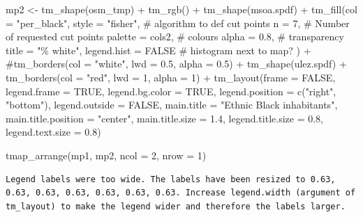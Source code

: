 \documentclass[
  letterpaper,
]{scrbook}
\newenvironment{Shaded}{\begin{snugshade}}{\end{snugshade}}
\newcommand{\AttributeTok}[1]{\textcolor[rgb]{0.40,0.45,0.13}{#1}}
\newcommand{\CommentTok}[1]{\textcolor[rgb]{0.37,0.37,0.37}{#1}}
\newcommand{\ConstantTok}[1]{\textcolor[rgb]{0.56,0.35,0.01}{#1}}
\newcommand{\DecValTok}[1]{\textcolor[rgb]{0.68,0.00,0.00}{#1}}
\newcommand{\FloatTok}[1]{\textcolor[rgb]{0.68,0.00,0.00}{#1}}
\newcommand{\FunctionTok}[1]{\textcolor[rgb]{0.28,0.35,0.67}{#1}}
\newcommand{\NormalTok}[1]{\textcolor[rgb]{0.00,0.23,0.31}{#1}}
\newcommand{\OtherTok}[1]{\textcolor[rgb]{0.00,0.23,0.31}{#1}}
\newcommand{\SpecialCharTok}[1]{\textcolor[rgb]{0.37,0.37,0.37}{#1}}
\newcommand{\StringTok}[1]{\textcolor[rgb]{0.13,0.47,0.30}{#1}}
\begin{document}
\begin{Shaded}
\begin{Highlighting}[]
\NormalTok{mp2 }\OtherTok{\textless{}{-}}  \FunctionTok{tm\_shape}\NormalTok{(osm\_tmp) }\SpecialCharTok{+} \FunctionTok{tm\_rgb}\NormalTok{() }\SpecialCharTok{+}
  \FunctionTok{tm\_shape}\NormalTok{(msoa.spdf) }\SpecialCharTok{+} 
  \FunctionTok{tm\_fill}\NormalTok{(}\AttributeTok{col =} \StringTok{"per\_black"}\NormalTok{, }
          \AttributeTok{style =} \StringTok{"fisher"}\NormalTok{, }\CommentTok{\# algorithm to def cut points}
          \AttributeTok{n =} \DecValTok{7}\NormalTok{, }\CommentTok{\# Number of requested cut points}
          \AttributeTok{palette =}\NormalTok{ cols2, }\CommentTok{\# colours}
          \AttributeTok{alpha =} \FloatTok{0.8}\NormalTok{, }\CommentTok{\# transparency }
          \AttributeTok{title =} \StringTok{"\% white"}\NormalTok{, }
          \AttributeTok{legend.hist =} \ConstantTok{FALSE} \CommentTok{\# histogram next to map?}
\NormalTok{          ) }\SpecialCharTok{+}
  \CommentTok{\#tm\_borders(col = "white", lwd = 0.5, alpha = 0.5) +}
  \FunctionTok{tm\_shape}\NormalTok{(ulez.spdf) }\SpecialCharTok{+}
  \FunctionTok{tm\_borders}\NormalTok{(}\AttributeTok{col =} \StringTok{"red"}\NormalTok{, }\AttributeTok{lwd =} \DecValTok{1}\NormalTok{, }\AttributeTok{alpha =} \DecValTok{1}\NormalTok{) }\SpecialCharTok{+}
  \FunctionTok{tm\_layout}\NormalTok{(}\AttributeTok{frame =} \ConstantTok{FALSE}\NormalTok{,}
            \AttributeTok{legend.frame =} \ConstantTok{TRUE}\NormalTok{, }\AttributeTok{legend.bg.color =} \ConstantTok{TRUE}\NormalTok{,}
            \AttributeTok{legend.position =} \FunctionTok{c}\NormalTok{(}\StringTok{"right"}\NormalTok{, }\StringTok{"bottom"}\NormalTok{),}
            \AttributeTok{legend.outside =} \ConstantTok{FALSE}\NormalTok{,}
            \AttributeTok{main.title =} \StringTok{"Ethnic Black inhabitants"}\NormalTok{, }
            \AttributeTok{main.title.position =} \StringTok{"center"}\NormalTok{,}
            \AttributeTok{main.title.size =} \FloatTok{1.4}\NormalTok{,}
            \AttributeTok{legend.title.size =} \FloatTok{0.8}\NormalTok{,}
            \AttributeTok{legend.text.size =} \FloatTok{0.8}\NormalTok{)}

\FunctionTok{tmap\_arrange}\NormalTok{(mp1, mp2, }\AttributeTok{ncol =} \DecValTok{2}\NormalTok{, }\AttributeTok{nrow =} \DecValTok{1}\NormalTok{)}
\end{Highlighting}
\end{Shaded}

\begin{verbatim}
Legend labels were too wide. The labels have been resized to 0.63, 0.63, 0.63, 0.63, 0.63, 0.63, 0.63. Increase legend.width (argument of tm_layout) to make the legend wider and therefore the labels larger.
\end{verbatim}
\end{document}
